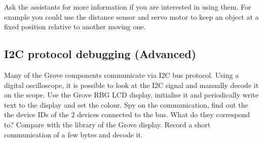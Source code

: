Ask the assistants for more information if you are interested in using them. For example you could use the distance sensor and servo motor to keep an object at a fixed position relative to another moving one.


\subsection{I2C protocol debugging (Advanced)}
Many of the Grove components communicate via I2C bus protocol. Using a digital oscilloscope, it is possible to look at the I2C signal and manually decode it on the scope. Use the Grove RBG LCD display, initialise it and periodically write text to the display and set the colour. Spy on the communication, find out the the device IDs of the 2 devices connected to the bus. What do they correspond to? Compare with the library of the Grove display. Record a short communication of a few bytes and decode it.

